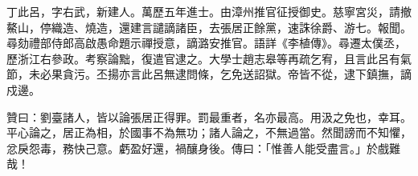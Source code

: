 \begin{pinyinscope}
丁此呂，字右武，新建人。萬歷五年進士。由漳州推官征授御史。慈寧宮災，請撤鰲山，停織造、燒造，還建言譴謫諸臣，去張居正餘黨，速誅徐爵、游七。報聞。尋劾禮部侍郎高啟愚命題示禪授意，謫潞安推官。語詳《李植傳》。尋遷太僕丞，歷浙江右參政。考察論黜，復遣官逮之。大學士趙志皋等再疏乞宥，且言此呂有氣節，未必果貪污。丕揚亦言此呂無逮問條，乞免送詔獄。帝皆不從，逮下鎮撫，謫戍邊。

贊曰：劉臺諸人，皆以論張居正得罪。罰最重者，名亦最高。用汲之免也，幸耳。平心論之，居正為相，於國事不為無功；諸人論之，不無過當。然聞謗而不知懼，忿戾怨毒，務快己意。虧盈好還，禍釀身後。傳曰：「惟善人能受盡言。」於戲難哉！


\end{pinyinscope}